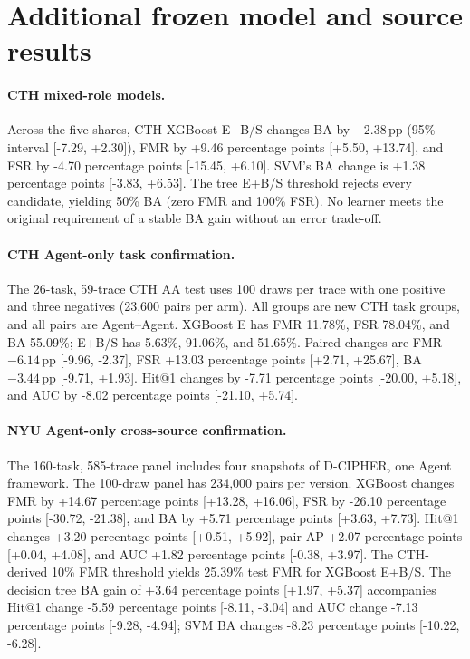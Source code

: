 \documentclass[10pt]{article}
\newcommand{\pp}{\ensuremath{\,\mathrm{pp}}}
\begin{document}
\section{Additional frozen model and source results}
\paragraph{CTH mixed-role models.} Across the five shares, CTH XGBoost E+B/S changes BA by $-2.38\pp$ (95\% interval [-7.29, +2.30]), FMR by +9.46 percentage points [+5.50, +13.74], and FSR by -4.70 percentage points [-15.45, +6.10]. SVM's BA change is +1.38 percentage points [-3.83, +6.53]. The tree E+B/S threshold rejects every candidate, yielding 50\% BA (zero FMR and 100\% FSR). No learner meets the original requirement of a stable BA gain without an error trade-off.

\paragraph{CTH Agent-only task confirmation.} The 26-task, 59-trace CTH AA test uses 100 draws per trace with one positive and three negatives (23,600 pairs per arm). All groups are new CTH task groups, and all pairs are Agent--Agent. XGBoost E has FMR 11.78\%, FSR 78.04\%, and BA 55.09\%; E+B/S has 5.63\%, 91.06\%, and 51.65\%. Paired changes are FMR $-6.14\pp$ [-9.96, -2.37], FSR +13.03 percentage points [+2.71, +25.67], BA $-3.44\pp$ [-9.71, +1.93]. Hit@1 changes by -7.71 percentage points [-20.00, +5.18], and AUC by -8.02 percentage points [-21.10, +5.74].

\paragraph{NYU Agent-only cross-source confirmation.} The 160-task, 585-trace panel includes four snapshots of D-CIPHER, one Agent framework. The 100-draw panel has 234,000 pairs per version. XGBoost changes FMR by +14.67 percentage points [+13.28, +16.06], FSR by -26.10 percentage points [-30.72, -21.38], and BA by +5.71 percentage points [+3.63, +7.73]. Hit@1 changes +3.20 percentage points [+0.51, +5.92], pair AP +2.07 percentage points [+0.04, +4.08], and AUC +1.82 percentage points [-0.38, +3.97]. The CTH-derived 10\% FMR threshold yields 25.39\% test FMR for XGBoost E+B/S. The decision tree BA gain of +3.64 percentage points [+1.97, +5.37] accompanies Hit@1 change -5.59 percentage points [-8.11, -3.04] and AUC change -7.13 percentage points [-9.28, -4.94]; SVM BA changes -8.23 percentage points [-10.22, -6.28].
\end{document}
